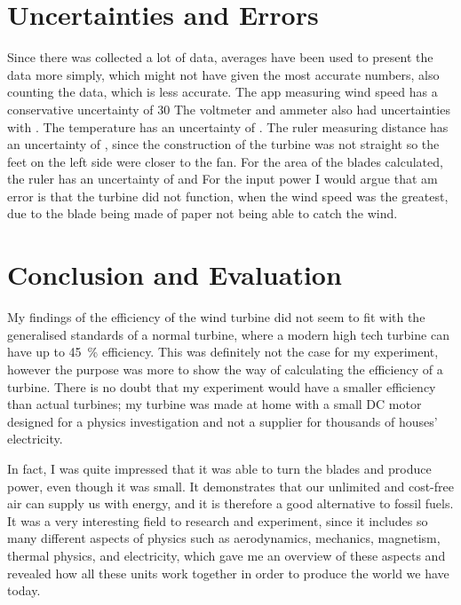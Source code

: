 \documentclass[12pt]{article}
\begin{document}
\section{Uncertainties and Errors}
Since there was collected a lot of data, averages have been used to present the data more simply, which might not have given the most accurate numbers, also counting the data, which is less accurate.
The app measuring wind speed has a conservative uncertainty of 30%
The voltmeter and ammeter also had uncertainties with .
The temperature has an uncertainty of .
The ruler measuring distance has an uncertainty of , since the construction of the turbine was not straight so the feet on the left side were closer to the fan.
For the area of the blades calculated, the ruler has an uncertainty of  and  
For the input power  
I would argue that am error is that the turbine did not function, when the wind speed was the greatest, due to the blade being made of paper not being able to catch the wind.

\section{Conclusion and Evaluation}
My findings of the efficiency of the wind turbine did not seem to fit with the generalised standards of a normal turbine, where a modern high tech turbine can have up to \SI{45}{\percent} efficiency.
This was definitely not the case for my experiment, however the purpose was more to show the way of calculating the efficiency of a turbine.
There is no doubt that my experiment would have a smaller efficiency than actual turbines; my turbine was made at home with a small DC motor designed for a physics investigation and not a supplier for thousands of houses' electricity.

In fact, I was quite impressed that it was able to turn the blades and produce power, even though it was small.
It demonstrates that our unlimited and cost-free air can supply us with energy, and it is therefore a good alternative to fossil fuels.
It was a very interesting field to research and experiment, since it includes so many different aspects of physics such as aerodynamics, mechanics, magnetism, thermal physics, and electricity, which gave me an overview of these aspects and revealed how all these units work together in order to produce the world we have today.
\end{document}
